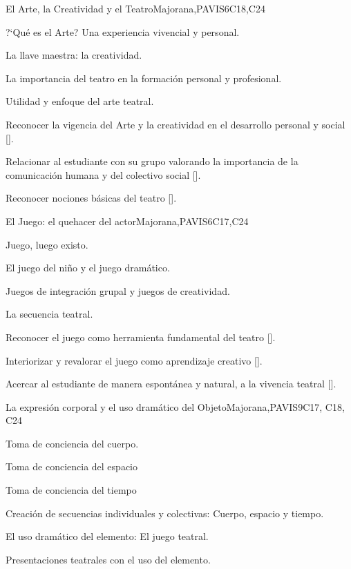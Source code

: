 \begin{syllabus}
\begin{unit}{}{El Arte, la Creatividad y el Teatro}{Majorana,PAVIS}{6}{C18,C24}
\begin{topics}
	\item ?`Qué es el Arte? Una experiencia vivencial y personal.
	\item La llave maestra: la creatividad.
	\item La importancia del teatro en la formación personal y profesional.
	\item Utilidad y enfoque del arte teatral.
\end{topics}
\begin{learningoutcomes}
	\item Reconocer la vigencia del Arte y la creatividad en el desarrollo personal y social [\Usage].
	\item Relacionar al estudiante con su grupo valorando la importancia de la comunicación humana y del colectivo  social [\Usage].
	\item Reconocer nociones  básicas del teatro [\Usage].
\end{learningoutcomes}
\end{unit}

\begin{unit}{}{El Juego: el  quehacer del actor}{Majorana,PAVIS}{6}{C17,C24}
\begin{topics}
	\item Juego, luego existo.
	\item El juego del niño y el juego dramático.
	\item Juegos de integración grupal y juegos de creatividad.
	\item La secuencia teatral.
\end{topics}
\begin{learningoutcomes}
	\item Reconocer el juego como herramienta fundamental del teatro [\Usage].
	\item Interiorizar y revalorar el juego como aprendizaje creativo [\Usage].
	\item Acercar al estudiante de manera espontánea y natural, a la vivencia teatral [\Usage].
\end{learningoutcomes}
\end{unit}

\begin{unit}{}{La expresión corporal y el uso dramático del Objeto}{Majorana,PAVIS}{9}{C17, C18, C24}
\begin{topics}
	\item Toma de conciencia del cuerpo.
	\item Toma de conciencia del espacio
	\item Toma de conciencia del tiempo
	\item Creación de secuencias individuales y colectivas: Cuerpo, espacio y tiempo.
	\item El uso dramático del elemento: El juego teatral.
	\item Presentaciones teatrales con el uso del elemento.


\end{topics}
\end{unit}
\end{syllabus}
